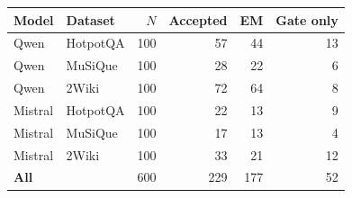 \begin{tabular}{@{}llrrrr@{}}
\toprule
Model & Dataset & $N$ & Accepted & EM & Gate only \\
\midrule
Qwen & HotpotQA & 100 & 57 & 44 & 13 \\
Qwen & MuSiQue & 100 & 28 & 22 & 6 \\
Qwen & 2Wiki & 100 & 72 & 64 & 8 \\
Mistral & HotpotQA & 100 & 22 & 13 & 9 \\
Mistral & MuSiQue & 100 & 17 & 13 & 4 \\
Mistral & 2Wiki & 100 & 33 & 21 & 12 \\
\midrule
\textbf{All} & & 600 & 229 & 177 & 52 \\
\bottomrule
\end{tabular}
